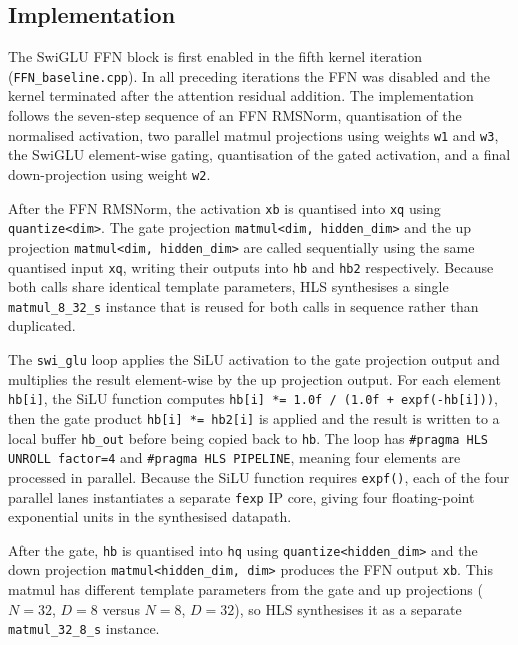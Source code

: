\subsection{Implementation}
\label{subsec:ffn_impl_detail}

The SwiGLU FFN block is first enabled in the fifth kernel iteration
(\texttt{FFN\_baseline.cpp}). In all preceding iterations the FFN was
disabled and the kernel terminated after the attention residual addition.
The implementation follows the seven-step sequence of an FFN RMSNorm, quantisation of the normalised
activation, two parallel matmul projections using weights \texttt{w1} and
\texttt{w3}, the SwiGLU element-wise gating, quantisation of the gated
activation, and a final down-projection using weight \texttt{w2}.

After the FFN RMSNorm, the activation
\texttt{xb} is quantised into \texttt{xq} using \texttt{quantize<dim>}.
The gate projection \texttt{matmul<dim, hidden\_dim>} and the up projection
\texttt{matmul<dim, hidden\_dim>} are called sequentially using the same
quantised input \texttt{xq}, writing their outputs into \texttt{hb} and
\texttt{hb2} respectively. Because both calls share identical template
parameters, HLS synthesises a single \texttt{matmul\_8\_32\_s} instance
that is reused for both calls in sequence rather than duplicated.

The \texttt{swi\_glu} loop applies
the SiLU activation to the gate projection output and multiplies the
result element-wise by the up projection output. For each element
\texttt{hb[i]}, the SiLU function computes \texttt{hb[i] *= 1.0f /
(1.0f + expf(-hb[i]))}, then the gate product \texttt{hb[i] *= hb2[i]}
is applied and the result is written to a local buffer \texttt{hb\_out}
before being copied back to \texttt{hb}. The loop has \texttt{\#pragma HLS
UNROLL factor=4} and \texttt{\#pragma HLS PIPELINE}, meaning four elements
are processed in parallel. Because the SiLU function requires
\texttt{expf()}, each of the four parallel lanes instantiates a separate
\texttt{fexp} IP core, giving four floating-point exponential units in the
synthesised datapath.

After the gate, \texttt{hb} is
quantised into \texttt{hq} using \texttt{quantize<hidden\_dim>} and
the down projection \texttt{matmul<hidden\_dim, dim>} produces the FFN
output \texttt{xb}. This matmul has different template parameters from
the gate and up projections ($N = 32$, $D = 8$ versus $N = 8$, $D = 32$),
so HLS synthesises it as a separate \texttt{matmul\_32\_8\_s} instance.

